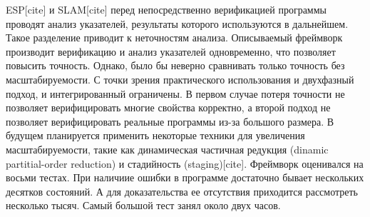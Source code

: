 ESP[cite] и SLAM[cite] перед непосредственно верификацией программы проводят анализ указателей, результаты которого используются в дальнейшем. Такое разделение приводит к неточностям анализа. Описываемый фреймворк производит верификацию и анализ указателей одновременно, что позволяет повысить точность. Однако, было бы неверно сравнивать только точность без масштабируемости. С точки зрения практического использования и двухфазный подход, и интегрированный ограничены. В первом случае потеря точности не позволяет верифицировать многие свойства корректно, а второй подход не позволяет верифицировать реальные программы из-за большого размера. В будущем планируется применить некоторые техники для увеличения масштабируемости, такие как динамическая частичная редукция (dinamic partitial-order reduction) и стадийность (staging)[cite]. 
Фреймворк оценивался на восьми тестах. При наличиие ошибки в программе достаточно бывает нескольких десятков состояний. А для доказательства ее отсутствия приходится рассмотреть несколько тысяч. Самый большой тест занял около двух часов.

